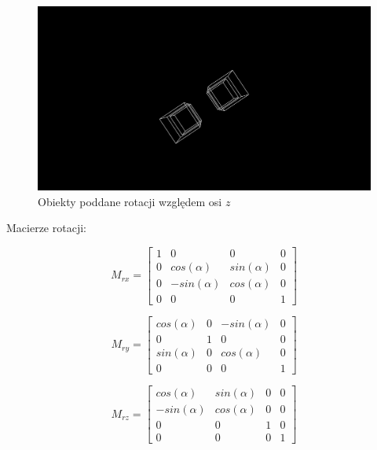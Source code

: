 \documentclass{article}
\begin{document}
        \begin{figure}
            \includegraphics[width=\textwidth]{rotate_z}
            \caption{Obiekty poddane rotacji względem osi \(z\)}
            \centering
        \end{figure}

        Macierze rotacji:

        \begin{equation}
            M_{rx}=
            \begin{bmatrix}
                1 & 0 & 0 & 0 \\
                0 & cos(\alpha) & sin(\alpha) & 0 \\
                0 & -sin(\alpha) & cos(\alpha) & 0 \\
                0 & 0 & 0 & 1
            \end{bmatrix}
        \end{equation}

        \begin{equation}
            M_{ry}=
            \begin{bmatrix}
                cos(\alpha) & 0 & -sin(\alpha) & 0 \\
                0 & 1 & 0 & 0 \\
                sin(\alpha) & 0 & cos(\alpha) & 0 \\
                0 & 0 & 0 & 1
            \end{bmatrix}
        \end{equation}

        \begin{equation}
            M_{rz}=
            \begin{bmatrix}
                cos(\alpha) & sin(\alpha) & 0 & 0 \\
                -sin(\alpha) & cos(\alpha) & 0 & 0 \\
                0 & 0 & 1 & 0 \\
                0 & 0 & 0 & 1
            \end{bmatrix}
        \end{equation}
\end{document}
